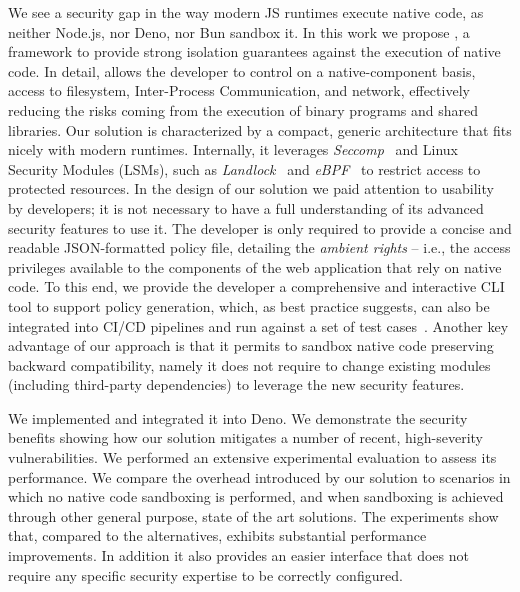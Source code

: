 We see a security gap in the way modern JS runtimes execute native
code, as neither Node.js, nor Deno, nor Bun sandbox it.  In this work
we propose \pap, a framework to provide strong isolation guarantees
against the execution of native code. In detail, \pap allows the
developer to control on a native-component basis, access to filesystem, Inter-Process
Communication, and network, effectively reducing the risks coming from
the execution of binary programs and shared libraries. Our solution is
characterized by a compact, generic architecture that fits nicely with
modern runtimes. Internally, it leverages {\em
  Seccomp}~\cite{seccompbpf} and Linux Security Modules (LSMs), such
as {\em Landlock}~\cite{landlock} and {\em eBPF}~\cite{corbet2014eBPF}
to restrict access to protected resources. In the design of our
solution we paid attention to usability by developers; it is not
necessary to have a full understanding of its advanced security
features to use it.  The developer is only required to provide a
concise and readable JSON-formatted policy file, detailing the {\em
  ambient rights} -- i.e., the access privileges available to the
components of the web application that rely on native code. To this
end, we provide the developer a comprehensive and interactive CLI tool
to support policy generation, which, as best practice
suggests, can also be integrated into CI/CD pipelines and run against
a set of test cases~\cite{sandtrap,slimtoolkit}. Another key advantage
of our approach is that it permits to sandbox native code preserving
backward compatibility, namely it does not require to change existing
modules (including third-party dependencies) to leverage the new
security features.

We implemented \pap and integrated it into Deno. We demonstrate the
security benefits showing how our solution mitigates a number of
recent, high-severity vulnerabilities. We performed an extensive
experimental evaluation to assess its performance. We compare the
overhead introduced by our solution to scenarios in which no native
code sandboxing is performed, and when sandboxing is achieved through
other general purpose, state of the art solutions. The experiments
show that, compared to the alternatives, \pap exhibits substantial
performance improvements. In addition it also provides an easier
interface that does not require any specific security expertise to be
correctly configured.


